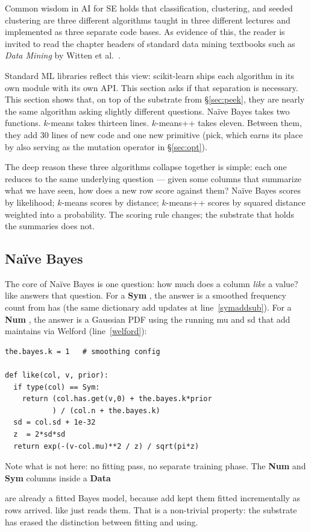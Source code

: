 \documentclass[AMA,STIX2COL]{WileyNJDv5}
\newcommand{\cls}[1]{%
  \setlength{\fboxsep}{1.5pt}%
  \colorbox{clsbg}{\sffamily\bfseries{#1}}%
}
\begin{document}
{Common wisdom in AI for SE holds that classification,
clustering, and seeded clustering are three different
algorithms taught in three different lectures and implemented
as three separate code bases. As evidence of this, the reader
is invited to read the chapter headers of standard data mining textbooks
such as {\em Data Mining} by Witten et al.~\cite{Witten:2005}.

Standard ML libraries reflect
this view: scikit-learn ships each algorithm in its own
module with its own API. This section asks if that separation is necessary.
 This section shows that, on top of the
substrate from \S\ref{sec:peek}, they are nearly the same
algorithm asking slightly different questions. Naïve Bayes takes two
functions. $k$-means takes thirteen lines. $k$-means++ takes
eleven. Between them, they add 30 lines of new code and one new
primitive (\textsf{pick}, which earns its place by also serving
as the mutation operator in \S\ref{sec:opt}).

The deep reason these three algorithms collapse together is
simple: each one reduces to the same underlying question — given
some columns that summarize what we have seen, how does a new
row score against them? Naïve Bayes scores by likelihood;
$k$-means scores by distance; $k$-means++ scores by squared
distance weighted into a probability. The scoring rule changes;
the substrate that holds the summaries does not.

\subsection{Naïve Bayes}

The core of Naïve Bayes is one question: how much does a column
{\em like} a value? \textsf{like} answers that question. For a
\cls{Sym}, the answer is a smoothed frequency count from
\textsf{has} (the same dictionary \textsf{add} updates at
line~\ref{symaddsub}). For a \cls{Num}, the answer is a Gaussian
PDF using the running \textsf{mu} and \textsf{sd} that
\textsf{add} maintains via Welford (line~\ref{welford}):

\begin{verbatim}
the.bayes.k = 1   # smoothing config

def like(col, v, prior):
  if type(col) == Sym:
    return (col.has.get(v,0) + the.bayes.k*prior
           ) / (col.n + the.bayes.k)
  sd = col.sd + 1e-32
  z  = 2*sd*sd
  return exp(-(v-col.mu)**2 / z) / sqrt(pi*z)
\end{verbatim}
Note what is not here: no fitting pass, no separate training
phase. The \cls{Num} and \cls{Sym} columns inside a \cls{Data}
are already a fitted Bayes model, because \textsf{add} kept them
fitted incrementally as rows arrived. \textsf{like} just reads
them. That is a non-trivial property: the substrate has erased
the distinction between fitting and using.

}
\end{document}
